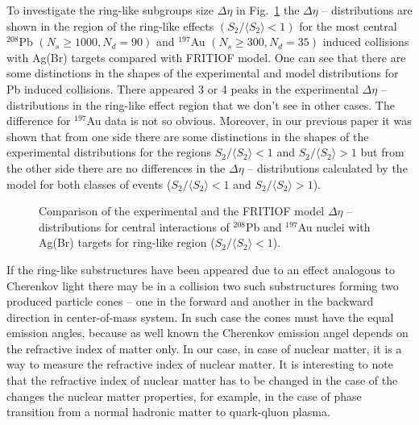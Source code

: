 \documentclass[12pt]{article}
\newcommand{\SDVA}{\langle S_2 \rangle}
\begin{document}
To investigate the ring-like subgroups size $\Delta\eta$ in Fig.~\ref{fig09} the $\Delta\eta$ -- distributions are shown in the region of the ring-like effects $(S_2/\SDVA < 1)$ for the most central ${}^{208}$Pb $(N_s \geq 1000, N_d = 90)$ and ${}^{197}$Au $(N_s \geq 300, N_d = 35)$ induced collisions with Ag(Br) targets compared with FRITIOF model. One can see that there are some distinctions in the shapes of the experimental and model distributions for Pb induced collisions. There appeared 3 or 4 peaks in the experimental $\Delta\eta$ -- distributions in the ring-like effect region that we don't see in other cases. The difference for ${}^{197}$Au data is not so obvious. Moreover, in our previous paper \cite{bib18} it was shown that from one side there are some distinctions in the shapes of the experimental distributions for the regions $S_2/\SDVA < 1$ and $S_2/\SDVA > 1$ but from the other side there are no differences in the $\Delta\eta$ -- distributions calculated by the model for both classes of events ($S_2/\SDVA < 1$ and $S_2/\SDVA > 1$).\\

\begin{figure}[!h]
\epsfysize=7cm
\begin{center}
\end{center}
\caption[*]{ Comparison of the experimental and the FRITIOF model $\Delta\eta$ -- distributions for central interactions of ${}^{208}$Pb and ${}^{197}$Au nuclei with Ag(Br) targets for ring-like region ($S_2/\SDVA < 1$). }
\label{fig09}
\end{figure}

If the ring-like substructures have been appeared due to an effect analogous to Cherenkov light there may be in a collision two such substructures forming two produced particle cones -- one in the forward and another in the backward direction in center-of-mass system. In such case the cones must have the equal emission angles, because as well known the Cherenkov emission angel depends on the refractive index of matter only. In our case, in case of nuclear matter, it is a way to measure the refractive index of nuclear matter. It is interesting to note that the refractive index of nuclear matter has to be changed in the case of the changes the nuclear matter properties, for example, in the case of phase transition from a normal hadronic matter to quark-qluon plasma.

\end{document}
